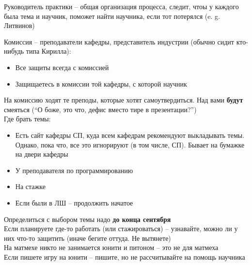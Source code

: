 \begin{definition}
	Руководитель практики -- общая организация процесса, следит, чтоы у каждого была тема и научник, поможет найти научника, если тот потерялся (e. g. Литвинов)
\end{definition}

\begin{definition}
	Комиссия -- преподаватели кафедры, представитель индустрии (обычно сидит кто-нибудь типа Кирилла):
	\begin{itemize}
		\item Все защиты всегда с комиссией
		\item Защищаетесь в комиссии той кафедры, с которой научник
	\end{itemize}
\end{definition}

На комиссию ходят те преподы, которые хотят самоутвердиться. Над вами \textbf{будут} смеяться (``О боже, это что, дефис вместо тире в презентации?'') \\
Где брать темы:
\begin{itemize}
	\item Есть сайт кафедры СП, куда всем кафедрам рекомендуют выкладывать темы. Однако, пока что, все это игнорируют (в том числе, СП). Бывает на бумажке на двери кафедры
	\item У преподавателя по программированию
	\item На стажке
	\item Если были в ЛШ -- продолжить начатое
\end{itemize}
Определиться с выбором темы надо \textbf{до конца сентября} \\
Если планируете где-то работать (или стажироваться) -- узнавайте, можно ли у них что-то защитить (иначе бегите оттуда. Не вытянете) \\
На матмехе никто не занимается юнити и питоном -- это не для матмеха \\
Если пишете игру на юнити -- пишите, но не рассчитывайте на помощь научника


